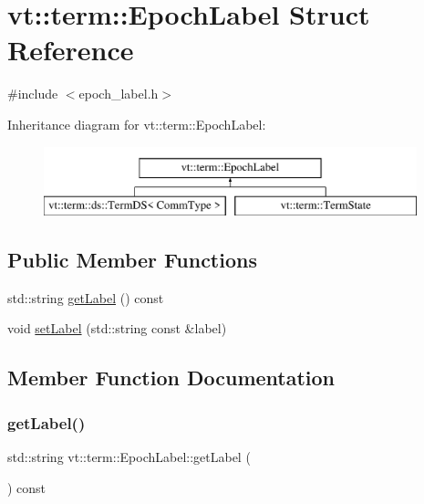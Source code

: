 \hypertarget{structvt_1_1term_1_1_epoch_label}{}\section{vt\+:\+:term\+:\+:Epoch\+Label Struct Reference}
\label{structvt_1_1term_1_1_epoch_label}


{\ttfamily \#include $<$epoch\+\_\+label.\+h$>$}

Inheritance diagram for vt\+:\+:term\+:\+:Epoch\+Label\+:\begin{figure}[H]
\begin{center}
\leavevmode
\includegraphics[height=2.000000cm]{structvt_1_1term_1_1_epoch_label}
\end{center}
\end{figure}
\subsection*{Public Member Functions}
\begin{DoxyCompactItemize}
\item 
std\+::string \hyperlink{structvt_1_1term_1_1_epoch_label_af480e2eb3a58aa315923ed241caac916}{get\+Label} () const
\item 
void \hyperlink{structvt_1_1term_1_1_epoch_label_ac140591669a7a6773626612feefe6009}{set\+Label} (std\+::string const \&label)
\end{DoxyCompactItemize}


\subsection{Member Function Documentation}
\mbox{\label{structvt_1_1term_1_1_epoch_label_af480e2eb3a58aa315923ed241caac916}} 
\subsubsection{\texorpdfstring{get\+Label()}{getLabel()}}
{\footnotesize\ttfamily std\+::string vt\+::term\+::\+Epoch\+Label\+::get\+Label (\begin{DoxyParamCaption}{ }\end{DoxyParamCaption}) const}

